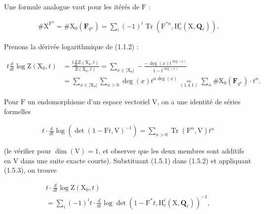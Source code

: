 \documentclass[10pt,leqno]{article}
\begin{document}
\noindent Une formule analogue vaut pour les itérés de \(\mathrm{F}\) :\par

\begin{equation*}\begin{gathered}\# \mathrm{X}^{\mathrm{F}^{n}} = \# \mathrm{X}_{0}(\mathbf{F}_{q^{n}}) = \sum _{i} (- 1)^{i} \operatorname{Tr}(\mathrm{F}^{*n}, \mathrm{H}_{c}^{i}(\mathrm{X}, \mathbf{Q}_{\ell })).\end{gathered}\tag{1.5.1}\end{equation*}

\noindent Prenons la dérivée logarithmique de (1.1.2) :\par

\begin{equation*}\begin{aligned}
t\frac{d}{dt}\log\mathrm Z(\mathrm X_0,t)&=\frac{t\frac{d}{dt}\mathrm Z(\mathrm X_0,t)}{\mathrm Z(\mathrm X_0,t)}
=\sum_{x\in|\mathrm X_0|}-\frac{-\deg(x)t^{\deg(x)}}{1-t^{\deg(x)}}\\
&=\sum_{x\in|\mathrm X_0|}\sum_{n>0}\deg(x)t^{n\deg(x)}
\underset{(1.4.1)}{=}\sum_n\#\mathrm X_0(\mathbf F_{q^n})\cdot t^n.
\end{aligned}\tag{1.5.2}\end{equation*}

\noindent Pour \(\mathrm{F}\) un endomorphisme d’un espace vectoriel \(\mathrm{V}\), on a une identité de séries formelles\par

\begin{equation*}\begin{gathered}t\cdot \frac{d}{dt} \operatorname{log}(\operatorname{det}(1- \mathrm{F}t, \mathrm{V})^{- 1}) = \sum _{n>0} \operatorname{Tr}(\mathrm{F}^{n}, \mathrm{V})t^{n}\end{gathered}\tag{1.5.3}\end{equation*}

\clearpage

\label{physical-5}\par\smallskip

\noindent (le vérifier pour \(\operatorname{dim}(\mathrm{V})=1\), et observer que les deux membres sont additifs en \(\mathrm{V}\) dans une suite exacte courte). Substituant (1.5.1) dans (1.5.2) et appliquant (1.5.3), on trouve\par

\begin{equation*}\begin{gathered}t\cdot \frac{d}{dt} \operatorname{log} \mathrm{Z}(\mathrm{X}_{0},t) \\ = \sum _{i} (- 1)^{i} t\cdot \frac{d}{dt} \operatorname{log} \operatorname{det}(1- \mathrm{F}^{*}t, \mathrm{H}_{c}^{i}(\mathrm{X},\mathbf{Q}_{\ell }))^{- 1},\end{gathered}\end{equation*}
\end{document}
